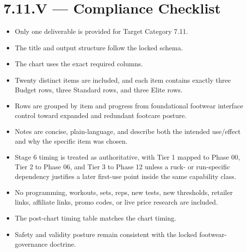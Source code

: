 \documentclass[10pt]{article}
\begin{document}
\section*{7.11.V — Compliance Checklist}
{}

\begin{itemize}
\item Only one deliverable is provided for Target Category 7.11.
\item The title and output structure follow the locked schema.
\item The chart uses the exact required columns.
\item Twenty distinct items are included, and each item contains exactly three Budget rows, three Standard rows, and three Elite rows.
\item Rows are grouped by item and progress from foundational footwear interface control toward expanded and redundant footcare posture.
\item Notes are concise, plain-language, and describe both the intended use/effect and why the specific item was chosen.
\item Stage 6 timing is treated as authoritative, with Tier 1 mapped to Phase 00, Tier 2 to Phase 06, and Tier 3 to Phase 12 unless a ruck- or run-specific dependency justifies a later first-use point inside the same capability class.
\item No programming, workouts, sets, reps, new tests, new thresholds, retailer links, affiliate links, promo codes, or live price research are included.
\item The post-chart timing table matches the chart timing.
\item Safety and validity posture remain consistent with the locked footwear-governance doctrine.
\end{itemize}
\end{document}
